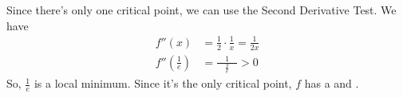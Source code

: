 \documentclass{article}
\begin{document}
\begin{enumerate}[resume]
\begin{enumerate}
\begin{solution}
      Since there's only one critical point, we can use the Second Derivative Test. We have
      \begin{align*}
        f''(x) &= \frac{1}{2} \cdot \frac{1}{x} = \frac{1}{2x} \\
        f'' \left( \frac{1}{e} \right) &= \frac{1}{\quad \frac{2}{e} \quad} > 0
      \end{align*}
      So, $\frac{1}{e}$ is a local minimum. Since it's the only critical point, $f$ has a  and
      .
    \end{solution}

  \end{enumerate}

\end{enumerate}
\end{document}
